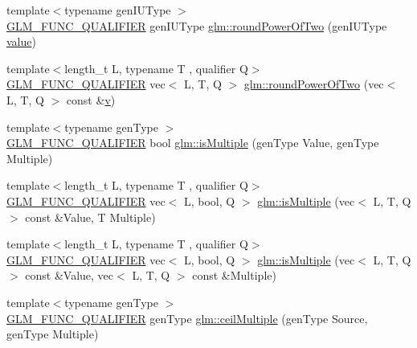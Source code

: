 \begin{DoxyCompactItemize}
\item 
{\footnotesize template$<$typename gen\+I\+U\+Type $>$ }\\\mbox{\hyperlink{setup_8hpp_a33fdea6f91c5f834105f7415e2a64407}{G\+L\+M\+\_\+\+F\+U\+N\+C\+\_\+\+Q\+U\+A\+L\+I\+F\+I\+ER}} gen\+I\+U\+Type \mbox{\hyperlink{group__gtc__round_gae4e1bf5d1cd179f59261a7342bdcafca}{glm\+::round\+Power\+Of\+Two}} (gen\+I\+U\+Type \mbox{\hyperlink{_s_d_l__opengl__glext_8h_a8ad81492d410ff2ac11f754f4042150f}{value}})
\item 
{\footnotesize template$<$length\+\_\+t L, typename T , qualifier Q$>$ }\\\mbox{\hyperlink{setup_8hpp_a33fdea6f91c5f834105f7415e2a64407}{G\+L\+M\+\_\+\+F\+U\+N\+C\+\_\+\+Q\+U\+A\+L\+I\+F\+I\+ER}} vec$<$ L, T, Q $>$ \mbox{\hyperlink{group__gtc__round_ga258802a7d55c03c918f28cf4d241c4d0}{glm\+::round\+Power\+Of\+Two}} (vec$<$ L, T, Q $>$ const \&\mbox{\hyperlink{_s_d_l__opengl_8h_a10a82eabcb59d2fcd74acee063775f90}{v}})
\item 
{\footnotesize template$<$typename gen\+Type $>$ }\\\mbox{\hyperlink{setup_8hpp_a33fdea6f91c5f834105f7415e2a64407}{G\+L\+M\+\_\+\+F\+U\+N\+C\+\_\+\+Q\+U\+A\+L\+I\+F\+I\+ER}} bool \mbox{\hyperlink{namespaceglm_a1749b696a2f7a956da67d67a557ae134}{glm\+::is\+Multiple}} (gen\+Type Value, gen\+Type Multiple)
\item 
{\footnotesize template$<$length\+\_\+t L, typename T , qualifier Q$>$ }\\\mbox{\hyperlink{setup_8hpp_a33fdea6f91c5f834105f7415e2a64407}{G\+L\+M\+\_\+\+F\+U\+N\+C\+\_\+\+Q\+U\+A\+L\+I\+F\+I\+ER}} vec$<$ L, bool, Q $>$ \mbox{\hyperlink{group__gtc__round_ga354caf634ef333d9cb4844407416256a}{glm\+::is\+Multiple}} (vec$<$ L, T, Q $>$ const \&Value, T Multiple)
\item 
{\footnotesize template$<$length\+\_\+t L, typename T , qualifier Q$>$ }\\\mbox{\hyperlink{setup_8hpp_a33fdea6f91c5f834105f7415e2a64407}{G\+L\+M\+\_\+\+F\+U\+N\+C\+\_\+\+Q\+U\+A\+L\+I\+F\+I\+ER}} vec$<$ L, bool, Q $>$ \mbox{\hyperlink{group__gtc__round_gabb4360e38c0943d8981ba965dead519d}{glm\+::is\+Multiple}} (vec$<$ L, T, Q $>$ const \&Value, vec$<$ L, T, Q $>$ const \&Multiple)
\item 
{\footnotesize template$<$typename gen\+Type $>$ }\\\mbox{\hyperlink{setup_8hpp_a33fdea6f91c5f834105f7415e2a64407}{G\+L\+M\+\_\+\+F\+U\+N\+C\+\_\+\+Q\+U\+A\+L\+I\+F\+I\+ER}} gen\+Type \mbox{\hyperlink{group__gtc__round_ga1d89ac88582aaf4d5dfa5feb4a376fd4}{glm\+::ceil\+Multiple}} (gen\+Type Source, gen\+Type Multiple)

\end{DoxyCompactItemize}
